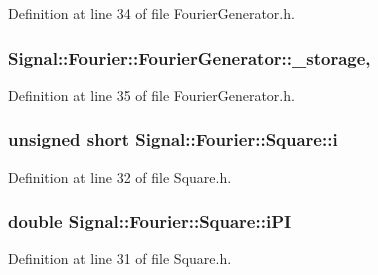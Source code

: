 Definition at line 34 of file Fourier\+Generator.\+h.

\hypertarget{classSignal_1_1Fourier_1_1FourierGenerator_ab6e6b79cf56e31c9a1b5766f357f8cfb}{
\subsubsection[{\+\_\+storage}]{ Signal\+::\+Fourier\+::\+Fourier\+Generator\+::\+\_\+storage\hspace{0.3cm}{\ttfamily [protected]}, {\ttfamily [inherited]}}}\label{classSignal_1_1Fourier_1_1FourierGenerator_ab6e6b79cf56e31c9a1b5766f357f8cfb}


Definition at line 35 of file Fourier\+Generator.\+h.

\hypertarget{classSignal_1_1Fourier_1_1Square_a942768cca477bd9bfc71f9a3ea1be8e5}{
\subsubsection[{i}]{\setlength{\rightskip}{0pt plus 5cm}unsigned short Signal\+::\+Fourier\+::\+Square\+::i\hspace{0.3cm}{\ttfamily [protected]}}}\label{classSignal_1_1Fourier_1_1Square_a942768cca477bd9bfc71f9a3ea1be8e5}


Definition at line 32 of file Square.\+h.

\hypertarget{classSignal_1_1Fourier_1_1Square_a78d566d8c876456c115c9160ea0eacd2}{
\subsubsection[{i\+P\+I}]{\setlength{\rightskip}{0pt plus 5cm}double Signal\+::\+Fourier\+::\+Square\+::i\+P\+I\hspace{0.3cm}{\ttfamily [protected]}}}\label{classSignal_1_1Fourier_1_1Square_a78d566d8c876456c115c9160ea0eacd2}


Definition at line 31 of file Square.\+h.

